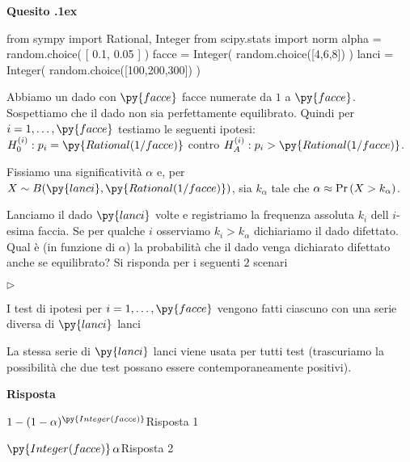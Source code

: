 \documentclass[11pt,twoside,a4paper]{article}
\newcommand{\mylabel}[1]{#1\hfill}
\renewenvironment{itemize}
  {\begin{list}{$\triangleright$}{%
   \setlength{\parskip}{0mm}
   \setlength{\topsep}{.4\baselineskip}
   \setlength{\rightmargin}{0mm}
   \setlength{\listparindent}{0mm}
   \setlength{\itemindent}{0mm}
   \setlength{\labelwidth}{2ex}
   \setlength{\itemsep}{.4\baselineskip}
   \setlength{\parsep}{0mm}
   \setlength{\partopsep}{0mm}
   \setlength{\labelsep}{1ex}
   \setlength{\leftmargin}{\labelwidth+\labelsep}
   \let\makelabel\mylabel}}{%
   \end{list}\vspace*{-1.3mm}}
\def\Pr{{\rm Pr\,}}
\newcounter{quesito}
\newenvironment{question}{\bigskip\addtocounter{quesito}{1}\par\textbf{Quesito \thequesito.\kern1ex}}{\vspace{\parskip}}
\newenvironment{answer}{\par\textbf{Risposta\quad}}{\vspace{\parskip}}
\begin{document}
\begin{question} %
\begin{pycode}
from sympy import Rational, Integer
from scipy.stats import norm
alpha = random.choice( [ 0.1, 0.05 ] ) 
facce = Integer( random.choice([4,6,8]) )
lanci = Integer( random.choice([100,200,300]) )
\end{pycode}
Abbiamo un dado con $\py{facce}$ facce numerate da $1$ a $\py{facce}$. Sospettiamo che il dado non sia perfettamente equilibrato. Quindi per $i=1,\dots,\py{facce}$ testiamo le seguenti ipotesi: $H^{(i)}_0:p_i=\py{Rational(1/facce)}$ contro $H^{(i)}_A:p_i>\py{Rational(1/facce)}$.

Fissiamo una significatività $\alpha$ e, per $X\sim B(\py{lanci}, \py{Rational(1/facce) } )$, sia $k_\alpha$ tale che $\alpha\approx\Pr(X>k_\alpha)$. 

Lanciamo il dado $\py{lanci}$ volte e registriamo la frequenza assoluta $k_i$ dell $i$-esima faccia. Se per qualche $i$ osserviamo $k_i>k_\alpha$ dichiariamo il dado difettato. Qual è (in funzione di $\alpha$) la probabilità che il dado venga dichiarato difettato anche se equilibrato? Si risponda per i seguenti $2$ scenari

\begin{itemize}
\item[1.] I test di ipotesi per $i=1,\dots,\py{facce}$ vengono fatti ciascuno con una serie diversa di $\py{lanci}$ lanci
\item[2.] La stessa serie di $\py{lanci}$ lanci viene usata per tutti test (trascuriamo la possibilità che due test possano essere contemporaneamente positivi).
\end{itemize}

\begin{answer}

{\color{blue}$1 - (1-\alpha)^{\py{Integer(facce) } }$\hfill Risposta 1}

{\color{blue}$\py{Integer(facce) }\,\alpha$\hfill Risposta 2}

\end{answer}
\end{question}
\end{document}
